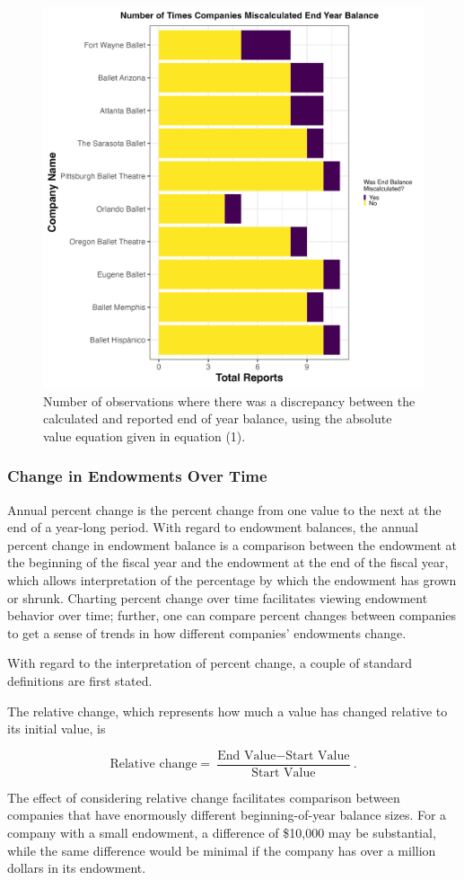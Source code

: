 \documentclass[Dance Data
Project,article,submit,moreauthors,pdftex]{mdpi}
\begin{document}
\begin{figure}[H]
\includegraphics[width=0.5\linewidth,]{../images/miscalc_end_bal} \caption{\label{fig:miscalc-by-comp}Number of observations where there was a discrepancy between the calculated and reported end of year balance, using the absolute value equation given in equation (1).}\label{fig:miscalc-by-comp}
\end{figure}

\hypertarget{change-in-endowments-over-time}{%
\subsubsection{Change in Endowments Over
Time}\label{change-in-endowments-over-time}}

Annual percent change is the percent change from one value to the next
at the end of a year-long period. With regard to endowment balances, the
annual percent change in endowment balance is a comparison between the
endowment at the beginning of the fiscal year and the endowment at the
end of the fiscal year, which allows interpretation of the percentage by
which the endowment has grown or shrunk. Charting percent change over
time facilitates viewing endowment behavior over time; further, one can
compare percent changes between companies to get a sense of trends in
how different companies' endowments change.

With regard to the interpretation of percent change, a couple of
standard definitions are first stated.

The relative change, which represents how much a value has changed
relative to its initial value, is

\[\text{Relative change} = \dfrac{\text{End Value} - \text{Start Value}}{ \text{Start Value}}.\]

The effect of considering relative change facilitates comparison between
companies that have enormously different beginning-of-year balance
sizes. For a company with a small endowment, a difference of \$10,000
may be substantial, while the same difference would be minimal if the
company has over a million dollars in its endowment.
\end{document}
